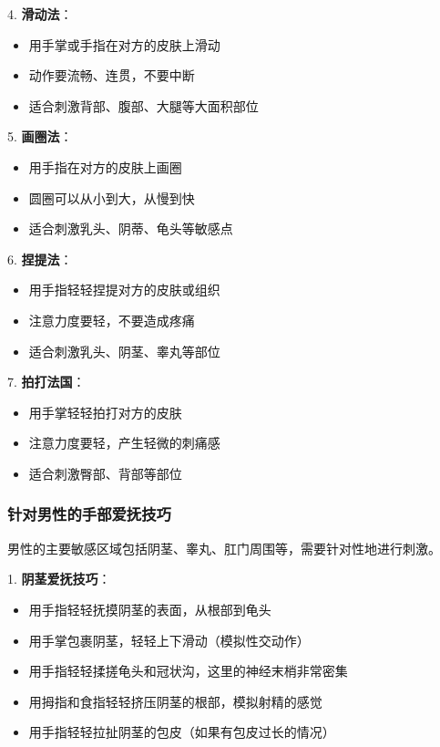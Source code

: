 \documentclass[12pt,UTF8]{ctexbook}
\begin{document}
4. \textbf{滑动法}：
  \begin{itemize}
  \item 用手掌或手指在对方的皮肤上滑动
  \item 动作要流畅、连贯，不要中断
  \item 适合刺激背部、腹部、大腿等大面积部位
  \end{itemize}

5. \textbf{画圈法}：
  \begin{itemize}
  \item 用手指在对方的皮肤上画圈
  \item 圆圈可以从小到大，从慢到快
  \item 适合刺激乳头、阴蒂、龟头等敏感点
  \end{itemize}

6. \textbf{捏提法}：
  \begin{itemize}
  \item 用手指轻轻捏提对方的皮肤或组织
  \item 注意力度要轻，不要造成疼痛
  \item 适合刺激乳头、阴茎、睾丸等部位
  \end{itemize}

7. \textbf{拍打法国}：
  \begin{itemize}
  \item 用手掌轻轻拍打对方的皮肤
  \item 注意力度要轻，产生轻微的刺痛感
  \item 适合刺激臀部、背部等部位
  \end{itemize}

\subsubsection{针对男性的手部爱抚技巧}

男性的主要敏感区域包括阴茎、睾丸、肛门周围等，需要针对性地进行刺激。

1. \textbf{阴茎爱抚技巧}：
  \begin{itemize}
  \item 用手指轻轻抚摸阴茎的表面，从根部到龟头
  \item 用手掌包裹阴茎，轻轻上下滑动（模拟性交动作）
  \item 用手指轻轻揉搓龟头和冠状沟，这里的神经末梢非常密集
  \item 用拇指和食指轻轻挤压阴茎的根部，模拟射精的感觉
  \item 用手指轻轻拉扯阴茎的包皮（如果有包皮过长的情况）
  \end{itemize}
\end{document}
